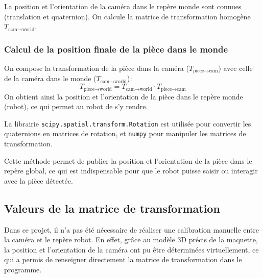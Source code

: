 La position et l’orientation de la caméra dans le repère monde sont connues (translation et quaternion). On calcule la matrice de transformation homogène $T_{\text{cam} \to \text{world}}$.

\subsubsection{Calcul de la position finale de la pièce dans le monde}

On compose la transformation de la pièce dans la caméra ($T_{\text{piece} \to \text{cam}}$) avec celle de la caméra dans le monde ($T_{\text{cam} \to \text{world}}$) :
\[
    T_{\text{piece} \to \text{world}} = T_{\text{cam} \to \text{world}} \cdot T_{\text{piece} \to \text{cam}}
\]
On obtient ainsi la position et l’orientation de la pièce dans le repère monde (robot), ce qui permet au robot de s'y rendre.

La librairie \texttt{scipy.spatial.transform.Rotation} est utilisée pour convertir les \gls{quaternions} en matrices de rotation, et \texttt{numpy} pour manipuler les matrices de transformation.

Cette méthode permet de publier la position et l'orientation de la pièce dans le repère global, ce qui est indispensable pour que le robot puisse saisir ou interagir avec la pièce détectée.

\subsection{Valeurs de la matrice de transformation}

Dans ce projet, il n'a pas été nécessaire de réaliser une calibration manuelle entre la caméra et le repère robot. En effet, grâce au modèle 3D précis de la maquette, la position et l'orientation de la caméra ont pu être déterminées virtuellement, ce qui a permis de renseigner directement la matrice de transformation dans le programme.

